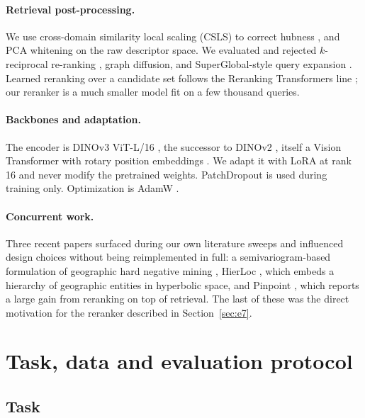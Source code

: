 \documentclass[11pt,a4paper]{article}
\begin{document}
\paragraph{Retrieval post-processing.}
We use cross-domain similarity local scaling (CSLS) \cite{conneau2018word} to correct hubness
\cite{radovanovic2010hubs}, and PCA whitening \cite{jegou2012negative} on the raw descriptor
space. We evaluated and rejected $k$-reciprocal re-ranking \cite{zhong2017reranking}, graph
diffusion, and SuperGlobal-style query expansion \cite{shao2023superglobal}. Learned
reranking over a candidate set follows the Reranking Transformers line
\cite{tan2021instance}; our reranker is a much smaller model fit on a few thousand queries.

\paragraph{Backbones and adaptation.}
The encoder is DINOv3 ViT-L/16 \cite{simeoni2025dinov3}, the successor to DINOv2
\cite{oquab2024dinov2}, itself a Vision Transformer \cite{dosovitskiy2021image} with rotary
position embeddings \cite{su2024roformer}. We adapt it with LoRA \cite{hu2022lora} at rank 16
and never modify the pretrained weights. PatchDropout \cite{liu2023patchdropout} is used
during training only. Optimization is AdamW \cite{loshchilov2019decoupled}.

\paragraph{Concurrent work.}
Three recent papers surfaced during our own literature sweeps and influenced design choices
without being reimplemented in full: a semivariogram-based formulation of geographic hard
negative mining \cite{semivariogram2025}, HierLoc \cite{hierloc2026}, which embeds a
hierarchy of geographic entities in hyperbolic space, and Pinpoint \cite{pinpoint2026},
which reports a large gain from reranking on top of retrieval. The last of these was the
direct motivation for the reranker described in Section~\ref{sec:e7}.

\section{Task, data and evaluation protocol}

\subsection{Task}
\end{document}

